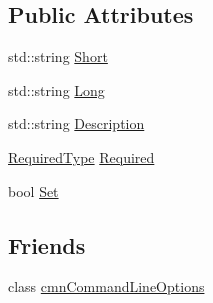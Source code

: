 \subsection*{Public Attributes}
\begin{DoxyCompactItemize}
\item 
std\-::string \hyperlink{classcmn_command_line_options_1_1_option_base_aa7799a5119c4018ddb5e10eebbde2d16}{Short}
\item 
std\-::string \hyperlink{classcmn_command_line_options_1_1_option_base_a6f6fcf584fda1640ff1197549e1f660c}{Long}
\item 
std\-::string \hyperlink{classcmn_command_line_options_1_1_option_base_a1500f66c5b609aae2148d84503d802f0}{Description}
\item 
\hyperlink{classcmn_command_line_options_ac239a3ca62dd4e3b391824f6f1a97c76}{Required\-Type} \hyperlink{classcmn_command_line_options_1_1_option_base_a053199a52c9a6696fe25af27c0979331}{Required}
\item 
bool \hyperlink{classcmn_command_line_options_1_1_option_base_a1bab794e3d379aabf0daf3edaf4abd54}{Set}
\end{DoxyCompactItemize}
\subsection*{Friends}
\begin{DoxyCompactItemize}
\item 
class \hyperlink{classcmn_command_line_options_1_1_option_base_a18923f23ed3914806f1edf878a64b422}{cmn\-Command\-Line\-Options}
\end{DoxyCompactItemize}


